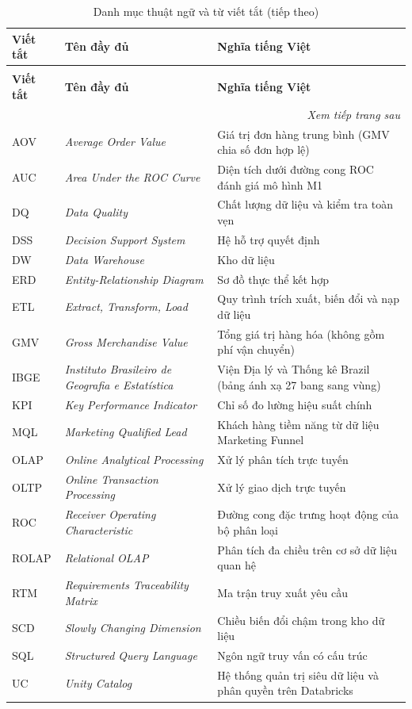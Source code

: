 \documentclass[a4paper]{article}
\begin{document}
\begin{longtable}{@{}l>{\raggedright\arraybackslash}p{}>{\raggedright\arraybackslash}p{}@{}}
\caption{Danh mục thuật ngữ và từ viết tắt}\label{tab:abbreviations}\\
\toprule
\textbf{Viết tắt} & \textbf{Tên đầy đủ} & \textbf{Nghĩa tiếng Việt} \\
\midrule
\endfirsthead
\caption[]{Danh mục thuật ngữ và từ viết tắt (tiếp theo)}\\
\toprule
\textbf{Viết tắt} & \textbf{Tên đầy đủ} & \textbf{Nghĩa tiếng Việt} \\
\midrule
\endhead
\midrule
\multicolumn{3}{r}{\textit{Xem tiếp trang sau}} \\
\endfoot
\bottomrule
\endlastfoot
AOV & \textit{Average Order Value} & Giá trị đơn hàng trung bình (GMV chia số đơn hợp lệ) \\
AUC & \textit{Area Under the ROC Curve} & Diện tích dưới đường cong ROC đánh giá mô hình M1 \\
DQ & \textit{Data Quality} & Chất lượng dữ liệu và kiểm tra toàn vẹn \\
DSS & \textit{Decision Support System} & Hệ hỗ trợ quyết định \\
DW & \textit{Data Warehouse} & Kho dữ liệu \\
ERD & \textit{Entity-Relationship Diagram} & Sơ đồ thực thể kết hợp \\
ETL & \textit{Extract, Transform, Load} & Quy trình trích xuất, biến đổi và nạp dữ liệu \\
GMV & \textit{Gross Merchandise Value} & Tổng giá trị hàng hóa (không gồm phí vận chuyển) \\
IBGE & \textit{Instituto Brasileiro de Geografia e Estatística} & Viện Địa lý và Thống kê Brazil (bảng ánh xạ 27 bang sang vùng) \\
KPI & \textit{Key Performance Indicator} & Chỉ số đo lường hiệu suất chính \\
MQL & \textit{Marketing Qualified Lead} & Khách hàng tiềm năng từ dữ liệu Marketing Funnel \\
OLAP & \textit{Online Analytical Processing} & Xử lý phân tích trực tuyến \\
OLTP & \textit{Online Transaction Processing} & Xử lý giao dịch trực tuyến \\
ROC & \textit{Receiver Operating Characteristic} & Đường cong đặc trưng hoạt động của bộ phân loại \\
ROLAP & \textit{Relational OLAP} & Phân tích đa chiều trên cơ sở dữ liệu quan hệ \\
RTM & \textit{Requirements Traceability Matrix} & Ma trận truy xuất yêu cầu \\
SCD & \textit{Slowly Changing Dimension} & Chiều biến đổi chậm trong kho dữ liệu \\
SQL & \textit{Structured Query Language} & Ngôn ngữ truy vấn có cấu trúc \\
UC & \textit{Unity Catalog} & Hệ thống quản trị siêu dữ liệu và phân quyền trên Databricks \\
\end{longtable}
\end{document}
